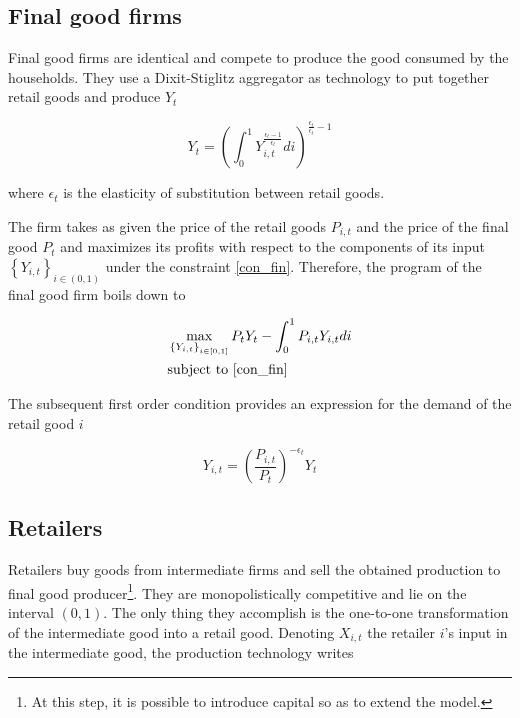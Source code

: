 \documentclass[a4paper]{article}
\begin{document}
\subsection{Final good firms}

Final good firms are identical and compete to produce the good consumed by the households. They use a Dixit-Stiglitz aggregator as technology to put together retail goods and produce $Y_t$

\begin{equation}
Y_t = \left( \int_{0}^{1} Y_{i,t}^{\frac{\epsilon_t - 1}{\epsilon_t}} di \right)^{\frac{\epsilon_t}{\epsilon_t} - 1} \label{con_fin}
\end{equation}

where $\epsilon_t$ is the elasticity of substitution between retail goods.

The firm takes as given the price of the retail goods $P_{i,t}$ and the price of the final good $P_t$ and maximizes its profits with respect to the components of its input $\left\{Y_{i,t}\right\}_{i\in(0,1)}$ under the constraint \eqref{con_fin}. Therefore, the program of the final good firm boils down to

\begin{align*}
&\max_{\left\{Y_{i,t}\right\}_{i\in[0,1]}} P_t Y_t - \int_{0}^{1} P_{i,t} Y_{i,t} di\\
&\text{subject to \eqref{con_fin}}
\end{align*}

The subsequent first order condition provides an expression for the demand of the retail good $i$

\begin{equation}
Y_{i,t} = \left( \frac{P_{i,t}}{P_t} \right)^{-\epsilon_t} Y_t \label{ret_dem}
\end{equation}

\subsection{Retailers}

Retailers buy goods from intermediate firms and sell the obtained production to final good producer\footnote{At this step, it is possible to introduce capital so as to extend the model.}. They are monopolistically competitive and lie on the interval $(0,1)$. The only thing they accomplish is the one-to-one transformation of the intermediate good into a retail good. Denoting $X_{i,t}$ the retailer $i$'s input in the intermediate good, the production technology writes
\end{document}
